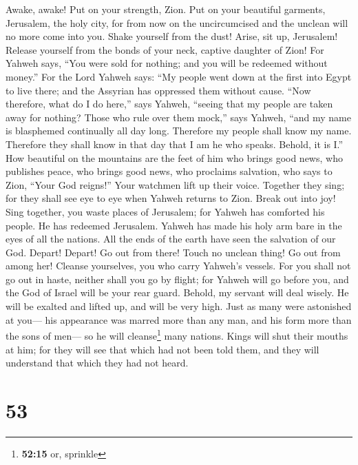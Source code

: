  Awake, awake! Put on your strength, Zion. Put on your
beautiful garments, Jerusalem, the holy city, for from now on the
uncircumcised and the unclean will no more come into you. 
Shake yourself from the dust! Arise, sit up, Jerusalem! Release yourself
from the bonds of your neck, captive daughter of Zion! 
For Yahweh says, ``You were sold for nothing; and you will be redeemed
without money.''  For the Lord Yahweh says: ``My people
went down at the first into Egypt to live there; and the Assyrian has
oppressed them without cause.  ``Now therefore, what do I
do here,'' says Yahweh, ``seeing that my people are taken away for
nothing? Those who rule over them mock,'' says Yahweh, ``and my name is
blasphemed continually all day long.  Therefore my people
shall know my name. Therefore they shall know in that day that I am he
who speaks. Behold, it is I.''  How beautiful on the
mountains are the feet of him who brings good news, who publishes peace,
who brings good news, who proclaims salvation, who says to Zion, ``Your
God reigns!''  Your watchmen lift up their voice. Together
they sing; for they shall see eye to eye when Yahweh returns to Zion.
 Break out into joy! Sing together, you waste places of
Jerusalem; for Yahweh has comforted his people. He has redeemed
Jerusalem.  Yahweh has made his holy arm bare in the eyes
of all the nations. All the ends of the earth have seen the salvation of
our God.  Depart! Depart! Go out from there! Touch no
unclean thing! Go out from among her! Cleanse yourselves, you who carry
Yahweh's vessels.  For you shall not go out in haste,
neither shall you go by flight; for Yahweh will go before you, and the
God of Israel will be your rear guard.  Behold, my
servant will deal wisely. He will be exalted and lifted up, and will be
very high.  Just as many were astonished at you--- his
appearance was marred more than any man, and his form more than the sons
of men---  so he will cleanse\footnote{\textbf{52:15} or,
  sprinkle} many nations. Kings will shut their mouths at him; for they
will see that which had not been told them, and they will understand
that which they had not heard.

\hypertarget{section-50}{%
\section{53}\label{section-50}}

